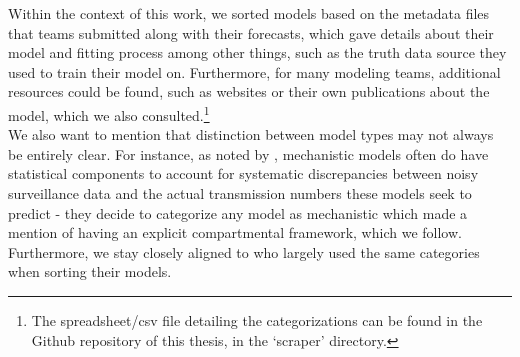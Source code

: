 Within the context of this work, we sorted models based on the metadata files that teams submitted along with their forecasts, which gave details about their model and fitting process among other things, such as the truth data source they used to train their model on. Furthermore, for many modeling teams, additional resources could be found, such as websites or their own publications about the model, which we also consulted.\footnote{The spreadsheet/csv file detailing the categorizations can be found in the Github repository of this thesis, in the `scraper' directory.} \\
We also want to mention that distinction between model types may not always be entirely clear. For instance, as noted by \cite{reich_collaborative_2019}, mechanistic models often do have statistical components to account for systematic discrepancies between noisy surveillance data and the actual transmission numbers these models seek to predict - they decide to categorize any model as mechanistic which made a mention of having an explicit compartmental framework, which we follow.
Furthermore, we stay closely aligned to \cite{bracher_pre-registered_2021} who largely used the same categories when sorting their models. %
